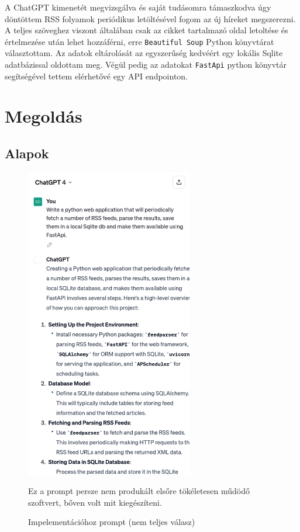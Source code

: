 \documentclass[]{article}
\begin{document}
A ChatGPT kimenetét megvizsgálva és saját tudásomra támaszkodva úgy döntöttem RSS folyamok periódikus letöltésével fogom az új híreket megszerezni. A teljes szöveghez viszont általában csak az cikket tartalmazó oldal letoltése és értelmezése után lehet hozzáférni, erre \texttt{Beautiful Soup} Python könyvtárat választottam. Az adatok eltárolását az egyszerűség kedvéért egy lokális Sqlite adatbázissal oldottam meg. Végül pedig az adatokat \texttt{FastApi} python könyvtár segítségével tettem elérhetővé egy API endpointon.

\section{Megoldás}

\subsection{Alapok}

\begin{figure}[H]
	\centering
	\includegraphics[width=0.65\textwidth]{prompt_2.pdf}
	\caption{Impelementációhoz prompt (nem teljes válasz)}{Ez a prompt persze nem produkált elsőre tökéletesen műdödő szoftvert, bőven volt mit kiegészíteni.}
\end{figure}
\end{document}
